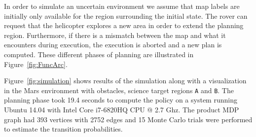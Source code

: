 \documentclass[conference]{IEEEtran}
\begin{document}
In order to simulate an uncertain environment we assume that map labels are initially only available for the region surrounding the initial state. The rover can request that the helicopter explores a new area in order to extend the planning region. Furthermore, if there is a mismatch between the map and what it encounters during execution, the execution is aborted and a new plan is computed. These different phases of planning are illustrated in Figure~\ref{fig:FuncArc}.

Figure~\ref{fig:simulation} shows results of the simulation along with a visualization in the Mars environment with obstacles, science target regions \texttt{A} and \texttt{B}. The planning phase took 19.4 seconds to compute the policy on a system running Ubuntu 14.04 with Intel Core i7-6820HQ CPU @ 2.7 Ghz. The product MDP graph had 393 vertices with 2752 edges and 15 Monte Carlo trials were performed to estimate the transition probabilities.


	
\end{document}
